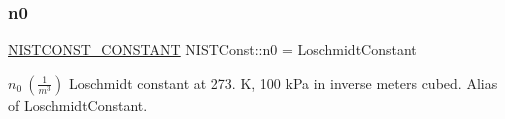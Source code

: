 \subsubsection{\texorpdfstring{n0}{n0}}
{\footnotesize\ttfamily \mbox{\hyperlink{group___n_i_s_t_const-_macros_ga2b0fc1d7452373f816175dd86ce26729}{N\+I\+S\+T\+C\+O\+N\+S\+T\+\_\+\+C\+O\+N\+S\+T\+A\+NT}} N\+I\+S\+T\+Const\+::n0 = Loschmidt\+Constant}

$n_0 \ (\frac{1}{m^3})$ Loschmidt constant at 273. K, 100 k\+Pa in inverse meters cubed. Alias of Loschmidt\+Constant. 